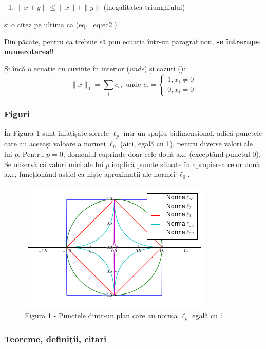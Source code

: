\documentclass[]{article}
\providecommand{\tightlist}{%
  \setlength{\itemsep}{0pt}\setlength{\parskip}{0pt}}
\begin{document}
\begin{enumerate}
\def\labelenumi{\arabic{enumi}.}
\tightlist
\item
  \(\|x + y\| \leq \|x\| + \|y\|\) (inegalitatea triunghiului)
\end{enumerate}

si o citez pe ultima ca (eq.~\ref{eq:ec2}).

Din păcate, pentru ca trebuie să pun ecuația într-un paragraf nou,
\textbf{se întrerupe numerotarea}!!

Și încă o ecuație cu cuvinte în interior (\emph{unde}) și cazuri (): \[
 \|x\|_0 = \sum_{i}^{} c_i, \textrm{ unde } c_i = \begin{cases} 1 , x_i \neq 0 \\ 0 , x_i = 0 \end{cases} 
\]

\subsubsection{Figuri}\label{figuri}

În Figura 1 sunt înfățișate sferele \(\ell_p\) într-un spațiu
bidimensional, adică punctele care au aceeași valoare a normei
\(\ell_p\) (aici, egală cu 1), pentru diverse valori ale lui \(p\).
Pentru \(p = 0\), domeniul cuprinde doar cele două axe (exceptând
punctul 0). Se observă că valori mici ale lui \(p\) implică puncte
situate în apropierea celor două axe, funcționând astfel ca niște
aproximații ale normei \(\ell_0\).

\begin{figure}[htbp]
\centering
\includegraphics{lpnorms.png}
\caption{Figura 1 - Punctele dintr-un plan care au norma \(\ell_p\)
egală cu 1}
\end{figure}

\subsubsection{Teoreme, definiții,
citari}\label{teoreme-definiux21bii-citari}
\end{document}
